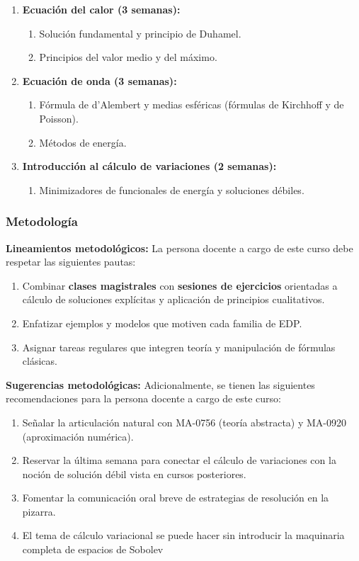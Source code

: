 \begin{refsection}
\begin{enumerate}
\item \textbf{Ecuación del calor (3 semanas):}
\begin{enumerate}
    \item Solución fundamental y principio de Duhamel.
    \item Principios del valor medio y del máximo.
\end{enumerate}

\item \textbf{Ecuación de onda (3 semanas):}
\begin{enumerate}
    \item Fórmula de d'Alembert y medias esféricas (fórmulas de Kirchhoff y de Poisson).
    \item Métodos de energía.
\end{enumerate}

\item \textbf{Introducción al cálculo de variaciones (2 semanas):}
\begin{enumerate}
    \item Minimizadores de funcionales de energía y soluciones débiles.
\end{enumerate}

\end{enumerate}

\subsubsection*{Metodología}

\noindent \textbf{Lineamientos metodológicos:} La persona docente a cargo de este curso debe respetar las siguientes pautas:

\begin{enumerate}
    \item Combinar \textbf{clases magistrales} con \textbf{sesiones de ejercicios} orientadas a cálculo de soluciones explícitas y aplicación de principios cualitativos.
    \item Enfatizar ejemplos y modelos que motiven cada familia de EDP.
    \item Asignar tareas regulares que integren teoría y manipulación de fórmulas clásicas.
\end{enumerate}

\textbf{Sugerencias metodológicas:} Adicionalmente, se tienen las siguientes recomendaciones para la persona docente a cargo de este curso:

\begin{enumerate}
    \item Señalar la articulación natural con MA-0756 (teoría abstracta) y MA-0920 (aproximación numérica).
    \item Reservar la última semana para conectar el cálculo de variaciones con la noción de solución débil vista en cursos posteriores.
    \item Fomentar la comunicación oral breve de estrategias de resolución en la pizarra.
    \item El tema de cálculo variacional se puede hacer sin introducir la maquinaria completa de espacios de Sobolev
\end{enumerate}


\end{refsection}
